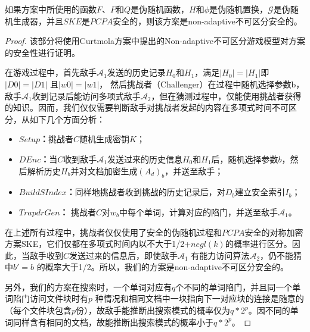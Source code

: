 \begin{thm}
\label{thm:ind_cka_security_proof}

如果方案中所使用的函数$F$、$P$和$Q$是伪随机函数，$H$和$\phi$是伪随机置换，$\mathcal{G}$是伪随机生成器，并且$SKE$是$PCPA$安全的，则该方案是non-adaptive不可区分安全的。

\begin{proof}
该部分将使用Curtmola方案中提出的Non-adaptive不可区分游戏模型对方案的安全性进行证明。

在游戏过程中，首先敌手$\mathcal{A}_1$发送的历史记录$H_0$和$H_1$，满足$|H_0| = |H_1|$即$|D0| = |D1|$ 且$|w0| = |w1|$， 然后挑战者（Challenger）在过程中随机选择参数b，敌手$\mathcal{A}_1$收到记录后能访问多项式敌手$\mathcal{A}_2$，但在猜测过程中，仅能使用挑战者获得的知识。因而，我们仅仅需要判断敌手对挑战者发起的内容在多项式时间不可区分，从如下几个方面分析：

\begin{itemize}
  \item \textbf{$Setup$：}挑战者$C$随机生成密钥$K$；

  \item \textbf{$DEnc$：}当$C$收到敌手$\mathcal{A}_1$发送过来的历史信息$H_0$和$H_1$后，随机选择参数$b$，然后解析历史$H_b$并对文档加密生成$(A_d)_b$，并送至敌手；

  \item \textbf{$BuildSIndex$：}同样地挑战者收到挑战的历史记录后，对$D_b$建立安全索引$I_b$；

  \item \textbf{$TrapdrGen$：}  挑战者$C$对$w_b$中每个单词，计算对应的陷门，并送至敌手$\mathcal{A}_1$。
\end{itemize}

在上述所有过程中，挑战者仅仅使用了安全的伪随机过程和$PCPA$安全的对称加密方案SKE，它们仅都在多项式时间内以不大于1/2+$negl(k)$的概率进行区分。因此，当敌手收到$C$发送过来的信息后，即使敌手$\mathcal{A}_1$ 有能力访问算法$\mathcal{A}_2$，仍不能猜中$b' = b$ 的概率大于1/2。所以，我们的方案是non-adaptive不可区分安全的。

另外，我们的方案在搜索时，一个单词对应有$q$个不同的单词陷门，并且同一个单词陷门访问文件块时有$p$ 种情况和相同文档中一块指向下一对应块的连接是随意的（每个文件块包含$p$份），故敌手能推断出搜索模式的概率仅为$q*2^p$。因不同的单词同样含有相同的文档，故能推断出搜索模式的概率小于$q*2^p$。

\end{proof}
\end{thm}



